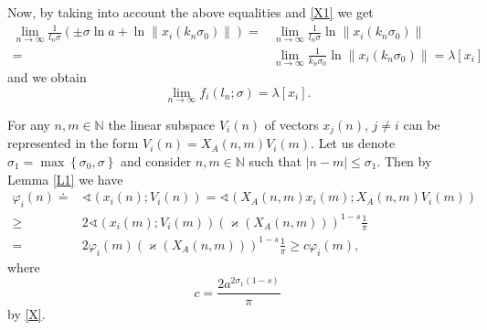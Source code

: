 \documentclass[11pt]{article}
\begin{document}
Now, by taking into account the above equalities and \eqref{X1} we get%
\begin{align*}
\lim_{n\to \infty }\frac{1}{l_{n}\sigma }( \pm \sigma \ln a+\ln
\left\| x_{i}( k_{n}\sigma _{0}) \right\| )
= &\lim_{n\to \infty }\frac{1}{l_{n}\sigma }\ln \left\| x_{i}(
k_{n}\sigma _{0}) \right\| \\
= & \lim_{n\to \infty }\frac{1}{k_{n}\sigma _{0}}\ln \left\|
x_{i}( k_{n}\sigma _{0}) \right\| =\lambda [ x_{i}]
\end{align*}%
and we obtain%
\begin{equation*}
\lim_{n\to \infty }f_{i}( l_{n};\sigma ) =\lambda [
x_{i}] .
\end{equation*}

For any $n,m\in \mathbb{N}$ the linear subspace $V_{i}( n) $ of
vectors $x_{j}( n) $, $j\neq i$ can be represented in the form $%
V_{i}( n) =X_{A}( n,m) V_{i}( m) $. Let us
denote $\sigma _{1}=\max \left\{ \sigma _{0},\sigma \right\} $ and consider $%
n,m\in \mathbb{N}$ such that $\left| n-m\right| \le \sigma _{1}$.
Then by Lemma \ref{L1} we have%
\begin{equation*}
\begin{split}
\varphi _{i}(n)\doteq &\sphericalangle (x_{i}(n);V_{i}(n)) 
=  \sphericalangle (X_{A}( n,m) x_{i}(m);X_{A}( n,m) V_{i}(m)) \\
\ge & 2\sphericalangle (x_{i}(m);V_{i}(m))( \varkappa ( X_{A}(
n,m) ) ) ^{1-s}\frac{1}{\pi } \\
= & 2\varphi _{i}( m) ( \varkappa ( X_{A}( n,m) ) ) ^{1-s}\frac{1%
}{\pi }\ge c\varphi _{i}(m),
\end{split}
\end{equation*}%
where%
\begin{equation*}
c=\frac{2a^{2\sigma _{1}( 1-s) }}{\pi }
\end{equation*}%
by \eqref{X}.
\end{document}
